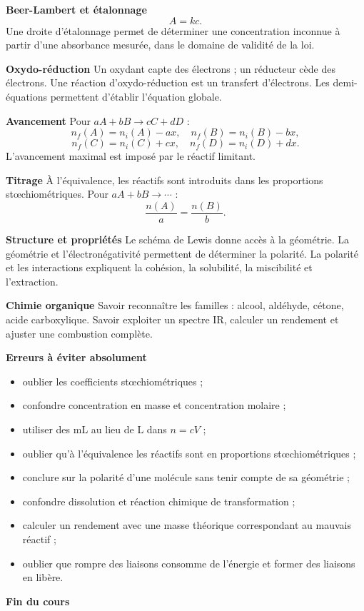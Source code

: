 \documentclass[11pt,a4paper]{article}
\begin{document}
\begin{retenirbox}
\textbf{Beer-Lambert et étalonnage}
\[
A=kc.
\]
Une droite d'étalonnage permet de déterminer une concentration inconnue à partir d'une absorbance mesurée, dans le domaine de validité de la loi.
\end{retenirbox}

\begin{retenirbox}
\textbf{Oxydo-réduction}
Un oxydant capte des électrons ; un réducteur cède des électrons. Une réaction d'oxydo-réduction est un transfert d'électrons. Les demi-équations permettent d'établir l'équation globale.
\end{retenirbox}

\begin{retenirbox}
\textbf{Avancement}
Pour $aA+bB\rightarrow cC+dD$ :
\[
n_f(A)=n_i(A)-ax,\quad n_f(B)=n_i(B)-bx,
\]
\[
n_f(C)=n_i(C)+cx,\quad n_f(D)=n_i(D)+dx.
\]
L'avancement maximal est imposé par le réactif limitant.
\end{retenirbox}

\begin{retenirbox}
\textbf{Titrage}
À l'équivalence, les réactifs sont introduits dans les proportions stœchiométriques. Pour $aA+bB\rightarrow\cdots$ :
\[
\frac{n(A)}{a}=\frac{n(B)}{b}.
\]
\end{retenirbox}

\begin{retenirbox}
\textbf{Structure et propriétés}
Le schéma de Lewis donne accès à la géométrie. La géométrie et l'électronégativité permettent de déterminer la polarité. La polarité et les interactions expliquent la cohésion, la solubilité, la miscibilité et l'extraction.
\end{retenirbox}

\begin{retenirbox}
\textbf{Chimie organique}
Savoir reconnaître les familles : alcool, aldéhyde, cétone, acide carboxylique. Savoir exploiter un spectre IR, calculer un rendement et ajuster une combustion complète.
\end{retenirbox}

\begin{erreurbox}
\textbf{Erreurs à éviter absolument}
\begin{itemize}
\item oublier les coefficients stœchiométriques ;
\item confondre concentration en masse et concentration molaire ;
\item utiliser des mL au lieu de L dans $n=cV$ ;
\item oublier qu'à l'équivalence les réactifs sont en proportions stœchiométriques ;
\item conclure sur la polarité d'une molécule sans tenir compte de sa géométrie ;
\item confondre dissolution et réaction chimique de transformation ;
\item calculer un rendement avec une masse théorique correspondant au mauvais réactif ;
\item oublier que rompre des liaisons consomme de l'énergie et former des liaisons en libère.
\end{itemize}
\end{erreurbox}

\begin{center}
\Large\bfseries Fin du cours
\end{center}
\end{document}
